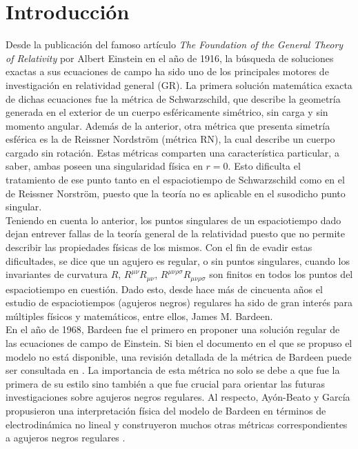 \documentclass[16pt,a4paper]{article}
\numberwithin{equation}{section}
\theoremstyle{definition}
\begin{document}
\newpage
\large
\tableofcontents
\newpage

\normalsize
\section{Introducción}

Desde la publicación del famoso artículo \textit{The Foundation of the General Theory of Relativity} %
por Albert Einstein en el año de 1916, la búsqueda de soluciones exactas a sus ecuaciones de campo ha sido uno de los principales motores de investigación en relatividad general (GR). La primera solución matemática exacta de dichas ecuaciones fue la métrica de Schwarzschild, que describe la geometría generada en el exterior de un cuerpo esféricamente simétrico, sin carga y sin momento angular. Además de la anterior, otra métrica que presenta simetría esférica es la de Reissner Nordström (métrica RN), la cual describe un cuerpo cargado sin rotación. Estas métricas comparten una característica particular, a saber, ambas poseen una singularidad física en $r = 0$. Esto dificulta el tratamiento de ese punto tanto en el espaciotiempo de Schwarzschild como en el de Reissner Norström, puesto que la teoría no es aplicable en el susodicho punto singular.\\

Teniendo en cuenta lo anterior, los puntos singulares de un espaciotiempo dado dejan entrever fallas de la teoría general de la relatividad puesto que no permite describir las propiedades físicas de los mismos. Con el fin de evadir estas dificultades, se dice que un agujero es regular, o sin puntos singulares, cuando los invariantes de curvatura $R$, $R^{\mu \nu}R_{\mu \nu}$, $R^{\mu \nu \rho \sigma}R_{\mu \nu \rho \sigma}$ son finitos en todos los puntos del espaciotiempo en cuestión. Dado esto, desde hace más de cincuenta años el estudio de espaciotiempos (agujeros negros) regulares ha sido de gran interés para múltiples físicos y matemáticos, entre ellos, James M. Bardeen. \\

En el año de 1968, Bardeen fue el primero en proponer una solución regular de las ecuaciones de campo de Einstein. Si bien el documento \cite{bardeen} en el que se propuso el modelo no está disponible, una revisión detallada de la métrica de Bardeen puede ser consultada en \cite{borde1994}. La importancia de esta métrica no solo se debe a que fue la primera de su estilo sino también a que fue crucial para orientar las futuras investigaciones sobre agujeros negros regulares. Al respecto, Ayón-Beato y García propusieron una interpretación física del modelo de Bardeen en términos de electrodinámica no lineal  \cite{ayon-beato2000} y construyeron muchos otras métricas correspondientes a agujeros negros regulares \cite{ayon-beato2005,ayon-beato1999-1,ayon-beato1999-2,ayon-beato1999-3}.\\
\end{document}

